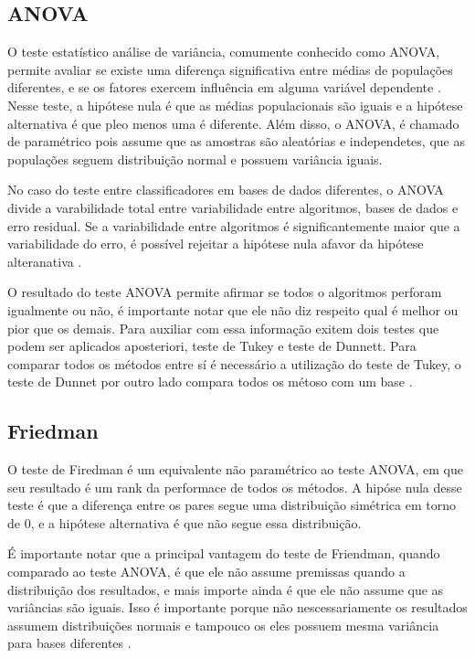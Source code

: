 \subsection{ANOVA}
O teste estatístico análise de variância, comumente conhecido como ANOVA, permite avaliar se existe uma diferença significativa entre médias de populações diferentes, e se os fatores exercem influência em alguma variável dependente \cite{milone2004estatística}. Nesse teste, a hipótese nula é que as médias populacionais são iguais e a hipótese alternativa é que pleo menos uma é diferente. Além disso, o ANOVA, é chamado de paramétrico pois assume que as amostras são aleatórias e independetes, que as populações seguem distribuição normal e possuem variância iguais.

No caso do teste entre classificadores em bases de dados diferentes, o ANOVA divide a varabilidade total entre variabilidade entre algoritmos, bases de dados e erro residual. Se a variabilidade entre algoritmos é significantemente maior que a variabilidade do erro, é possível rejeitar a hipótese nula afavor da hipótese alteranativa \cite{demvsar2006statistical}.

O resultado do teste ANOVA permite afirmar se todos o algoritmos perforam igualmente ou não, é importante notar que ele não diz respeito qual é melhor ou pior que os demais. Para auxiliar com essa informação exitem dois testes que podem ser aplicados aposteriori, teste de Tukey e teste de Dunnett. Para comparar todos os métodos entre sí é necessário a utilização do teste de Tukey, o teste de Dunnet por outro lado compara todos os métoso com um base \cite{demvsar2006statistical}.

\subsection{Friedman}

O teste de Firedman é um equivalente não paramétrico ao teste ANOVA, em que seu resultado é um rank da performace de todos os métodos. A hipóse nula desse teste é que a diferença entre os pares segue uma distribuição simétrica em torno de 0, e a hipótese alternativa é que não segue essa distribuição.

É importante notar que a principal vantagem do teste de Friendman, quando comparado ao teste ANOVA, é que ele não assume premissas quando a distribuição dos resultados, e mais importe ainda é que ele não assume que as variâncias são iguais. Isso é importante porque não nescessariamente os resultados assumem distribuições normais e tampouco os eles possuem mesma variância para bases diferentes \cite{demvsar2006statistical}.








